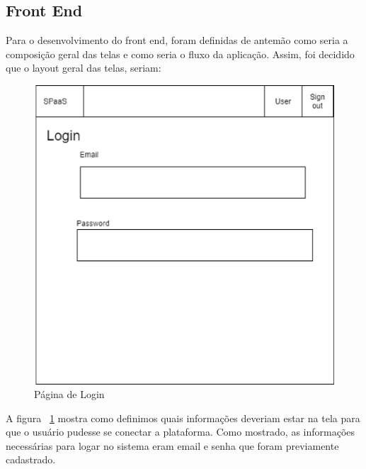 \documentclass[11pt,twoside]{article}
\begin{document}
\subsection{Front End}

Para o desenvolvimento do front end, foram definidas de antemão como seria a composição geral das telas e como seria o fluxo da aplicação. Assim, foi decidido que o layout geral das telas, seriam:

\begin{figure}[!h]
  \centering
  \includegraphics[scale=0.4]{login.eps}
  \caption{Página de Login}
  \label{fig:loginScreen}
\end{figure}

A figura ~\ref{fig:loginScreen} mostra como definimos quais informações deveriam estar na tela para que o usuário pudesse se conectar a plataforma. Como mostrado, 
as informações necessárias para logar no sistema eram email e senha que foram previamente cadastrado.
\end{document}
